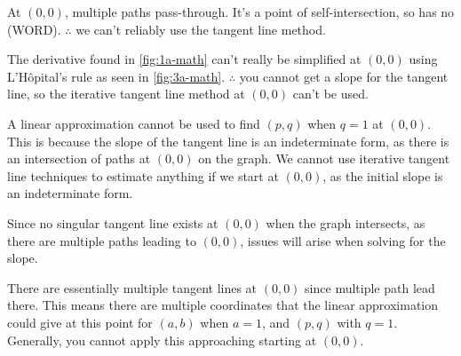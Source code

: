 \documentclass[answers,addpoints]{exam}
\begin{document}
\begin{questions}
\begin{solution}
    At $(0,0)$, multiple paths pass-through. It's a point of self-intersection, so has no (WORD). $\therefore$ we can't reliably use the tangent line method.

    The derivative found in \ref{fig:1a-math} can't really be simplified at $(0,0)$ using L'Hôpital's rule as seen in \ref{fig:3a-math}. $\therefore$ you cannot get a slope for the tangent line, so the iterative tangent line method at $(0,0)$ can't be used.

    A linear approximation cannot be used to find $(p,q)$ when $q=1$ at $(0,0)$. This is because the slope of the tangent line is an indeterminate form, as there is an intersection of paths at $(0,0)$ on the graph. We cannot use iterative tangent line techniques to estimate anything if we start at $(0,0)$, as the initial slope is an indeterminate form.

    Since no singular tangent line exists at $(0,0)$ when the graph intersects, as there are multiple paths leading to $(0,0)$, issues will arise when solving for the slope.

    There are essentially multiple tangent lines at $(0,0)$ since multiple path lead there. This means there are multiple coordinates that the linear approximation could give at this point for $(a,b)$ when $a=1$, and $(p,q)$ with $q=1$. Generally, you cannot apply this approaching starting at $(0,0)$.

  \end{solution}


  \hrulefill


\end{questions}
\end{document}
